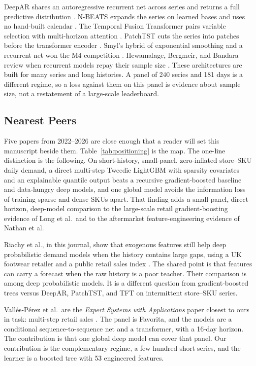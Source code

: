 \documentclass[review,authoryear]{elsarticle}
\begin{document}
DeepAR shares an autoregressive recurrent net across series and returns a full predictive distribution \citep{salinas2020deepar}. N-BEATS expands the series on learned bases and uses no hand-built calendar \citep{oreshkin2020nbeats}. The Temporal Fusion Transformer pairs variable selection with multi-horizon attention \citep{lim2021tft}. PatchTST cuts the series into patches before the transformer encoder \citep{nie2023patchtst}. Smyl's hybrid of exponential smoothing and a recurrent net won the M4 competition \citep{smyl2020hybrid}. Hewamalage, Bergmeir, and Bandara review when recurrent models repay their sample size \citep{hewarmalage2021rnn}. These architectures are built for many series and long histories. A panel of 240 series and 181 days is a different regime, so a loss against them on this panel is evidence about sample size, not a restatement of a large-scale leaderboard.

\subsection{Nearest Peers}
\label{sec:positioning}

Five papers from 2022--2026 are close enough that a reader will set this manuscript beside them. Table~\ref{tab:positioning} is the map. The one-line distinction is the following. On short-history, small-panel, zero-inflated store--SKU daily demand, a direct multi-step Tweedie LightGBM with sparsity covariates and an explainable quantile output beats a recursive gradient-boosted baseline and data-hungry deep models, and one global model avoids the information loss of training sparse and dense SKUs apart. That finding adds a small-panel, direct-horizon, deep-model comparison to the large-scale retail gradient-boosting evidence of Long et al.\ and to the aftermarket feature-engineering evidence of Nathan et al.

Riachy et al., in this journal, show that exogenous features still help deep probabilistic demand models when the history contains large gaps, using a UK footwear retailer and a public retail sales index \citep{riachy2025eswa}. The shared point is that features can carry a forecast when the raw history is a poor teacher. Their comparison is among deep probabilistic models. It is a different question from gradient-boosted trees versus DeepAR, PatchTST, and TFT on intermittent store--SKU series.

Vall\'es-P\'erez et al.\ are the \emph{Expert Systems with Applications} paper closest to ours in task: multi-step retail sales \citep{valles2022eswa}. The panel is Favorita, and the models are a conditional sequence-to-sequence net and a transformer, with a 16-day horizon. The contribution is that one global deep model can cover that panel. Our contribution is the complementary regime, a few hundred short series, and the learner is a boosted tree with 53 engineered features.
\end{document}
